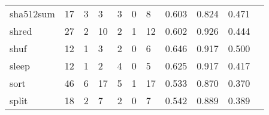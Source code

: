 \begin{longtable}{lp{1.2cm}p{1.2cm}p{1.2cm}p{1.2cm}p{1.2cm}p{1.2cm}p{1.2cm}p{1.2cm}p{1.2cm}p{1.2cm}}
sha512sum &                                    17 &                                                  3 &                                                  3 &                                                  3 &                                                  0 &                                                  8 &                                         0.603 &                                              0.824 &                                              0.471 \\
shred     &                                    27 &                                                  2 &                                                 10 &                                                  2 &                                                  1 &                                                 12 &                                         0.602 &                                              0.926 &                                              0.444 \\
shuf      &                                    12 &                                                  1 &                                                  3 &                                                  2 &                                                  0 &                                                  6 &                                         0.646 &                                              0.917 &                                              0.500 \\
sleep     &                                    12 &                                                  1 &                                                  2 &                                                  4 &                                                  0 &                                                  5 &                                         0.625 &                                              0.917 &                                              0.417 \\
sort      &                                    46 &                                                  6 &                                                 17 &                                                  5 &                                                  1 &                                                 17 &                                         0.533 &                                              0.870 &                                              0.370 \\
split     &                                    18 &                                                  2 &                                                  7 &                                                  2 &                                                  0 &                                                  7 &                                         0.542 &                                              0.889 &                                              0.389 \\

\end{longtable}
